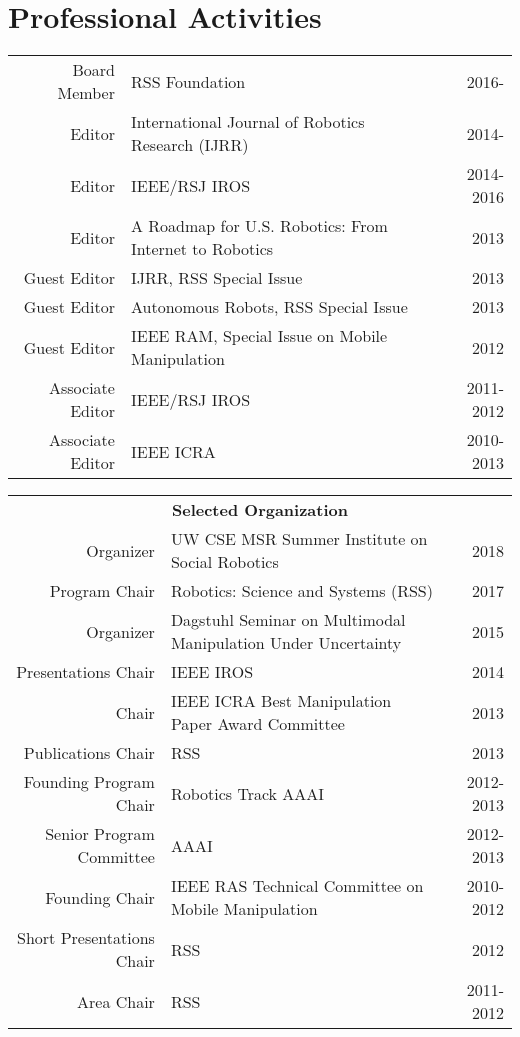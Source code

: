 
\section{Professional Activities}
\begin{tabularx}{\linewidth}{rXr}
Board Member & RSS Foundation & 2016-\\
Editor & International Journal of Robotics Research (IJRR) & 2014-\\
Editor & IEEE/RSJ IROS &  2014-2016\\
Editor & A Roadmap for U.S. Robotics: From Internet to Robotics & 2013\\
Guest Editor & IJRR, RSS Special Issue & 2013\\ 
Guest Editor & Autonomous Robots, RSS Special Issue & 2013\\ 
Guest Editor & IEEE RAM, Special Issue on Mobile Manipulation & 2012\\
Associate Editor & IEEE/RSJ IROS & 2011-2012\\
Associate Editor & IEEE ICRA & 2010-2013\\
\end{tabularx}

\begin{tabularx}{\linewidth}{rXr}
\multicolumn{3}{c}{\textbf{Selected Organization}}\\
Organizer & UW CSE MSR Summer Institute on Social Robotics & 2018\\
Program Chair & Robotics: Science and Systems (RSS) & 2017\\
Organizer & Dagstuhl Seminar on Multimodal Manipulation Under Uncertainty & 2015 \\
Presentations Chair & IEEE IROS & 2014\\ 
Chair & IEEE ICRA Best Manipulation Paper Award Committee & 2013\\
Publications Chair & RSS & 2013\\
Founding Program Chair & Robotics Track AAAI & 2012-2013 \\
Senior Program Committee & AAAI & 2012-2013 \\
Founding Chair & IEEE RAS Technical Committee on Mobile 
Manipulation & 2010-2012\\
Short Presentations Chair & RSS & 2012\\
Area Chair & RSS & 2011-2012\\
\end{tabularx}

